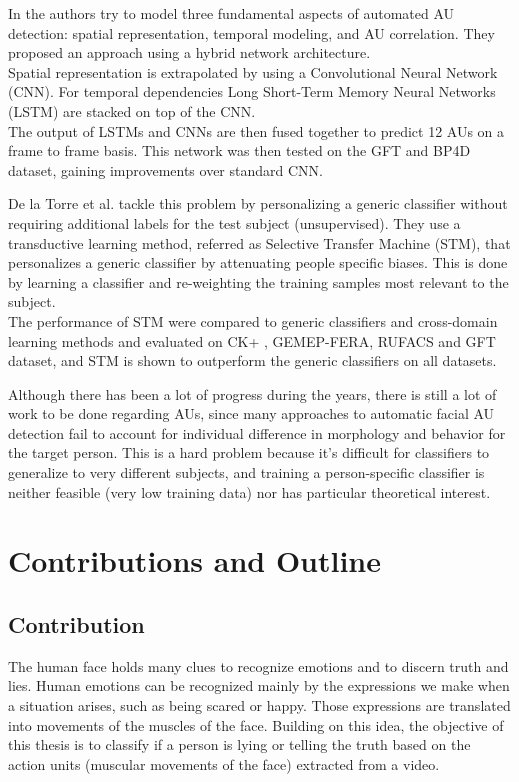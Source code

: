 In \cite{AU_LSTM} the authors try to model three fundamental aspects of automated AU detection: spatial representation, temporal modeling, and AU correlation. They proposed an approach using a hybrid network architecture. \\
Spatial representation is extrapolated by using a Convolutional Neural Network (CNN). For temporal dependencies Long Short-Term Memory Neural Networks (LSTM) are stacked on top of the CNN. \\
The output of LSTMs and CNNs are then fused together to predict 12 AUs on a frame to frame basis. This network was then tested on the GFT and BP4D \cite{BP4D-Spontaneous} dataset, gaining improvements over standard CNN.

De la Torre et al. \cite{AU_STM} \cite{AU_STM2} tackle this problem by personalizing a generic classifier without requiring additional labels for the test subject (unsupervised). They use a transductive learning method, referred as Selective Transfer Machine (STM), that personalizes a generic classifier by attenuating people specific biases. This is done by  learning a classifier and re-weighting the training samples most relevant to the subject. \\
The performance of STM were compared to generic classifiers and cross-domain learning methods and evaluated on CK+ \cite{CK+}, GEMEP-FERA, RUFACS and GFT dataset, and STM is shown to outperform the generic classifiers on all datasets.

Although there has been a lot of progress during the years, there is still a lot of work to be done regarding AUs, since many approaches to automatic facial AU detection fail to account for individual difference in morphology and behavior for the target person. This is a hard problem because it's difficult for classifiers to generalize to very different subjects, and training a person-specific classifier is neither feasible (very low training data) nor has particular theoretical interest. 

\clearpage

\section{Contributions and Outline} \label{contrib}

\subsection{Contribution}
The human face holds many clues to recognize emotions and to discern truth and lies. Human emotions can be recognized mainly by the expressions we make when a situation arises, such as being scared or happy. Those expressions are translated into movements of the muscles of the face. Building on this idea, the objective of this thesis is to classify if a person is lying or telling the truth based on the action units (muscular movements of the face) extracted from a video. 

